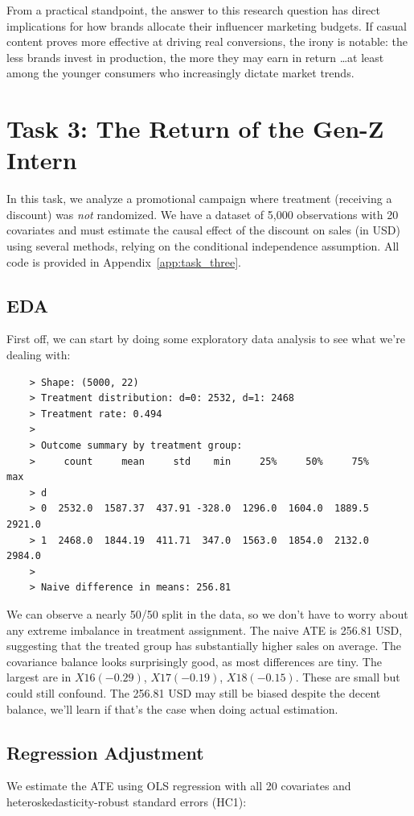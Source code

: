 \documentclass[10pt]{article}
\begin{document}
From a practical standpoint, the answer to this research question has direct implications for how brands allocate their influencer marketing budgets. If casual content proves more effective at driving real conversions, the irony is notable: the less brands invest in production, the more they may earn in return \dots at least among the younger consumers who increasingly dictate market trends.


\newpage
\section{Task 3: The Return of the Gen-Z Intern}
In this task, we analyze a promotional campaign where treatment (receiving a discount) was \textit{not} randomized. We have a dataset of 5,000 observations with 20 covariates and must estimate the causal effect of the discount on sales (in USD) using several methods, relying on the conditional independence assumption. All code is provided in Appendix~\ref{app:task_three}.

\subsection{EDA}
First off, we can start by doing some exploratory data analysis to see what we're dealing with: 

\begin{verbatim}
    > Shape: (5000, 22)
    > Treatment distribution: d=0: 2532, d=1: 2468
    > Treatment rate: 0.494
    >
    > Outcome summary by treatment group:
    >     count     mean     std    min     25%     50%     75%     max
    > d
    > 0  2532.0  1587.37  437.91 -328.0  1296.0  1604.0  1889.5  2921.0
    > 1  2468.0  1844.19  411.71  347.0  1563.0  1854.0  2132.0  2984.0
    >
    > Naive difference in means: 256.81

\end{verbatim}

We can observe a nearly 50/50 split in the data, so we don't have to worry about any extreme imbalance in treatment assignment. The naive ATE is 256.81 USD, suggesting that the treated group has substantially higher sales on average. The covariance balance looks surprisingly good, as most differences are tiny. The largest are in $X16 (-0.29)$, $X17 (-0.19)$, $X18 (-0.15)$. These are small but could still confound. The 256.81 USD may still be biased despite the decent balance, we'll learn if that's the case when doing actual estimation.

\subsection{Regression Adjustment}
We estimate the ATE using OLS regression with all 20 covariates and heteroskedasticity-robust standard errors (HC1):
\end{document}
